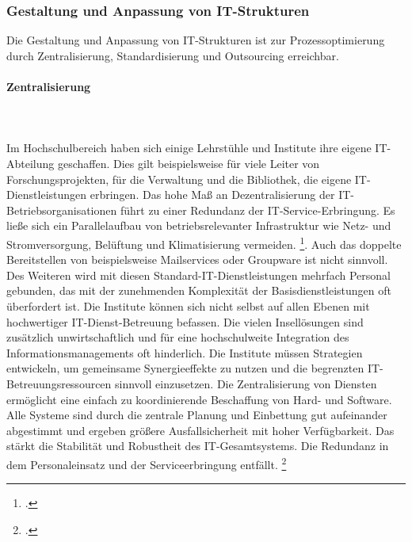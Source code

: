

\subsubsection{Gestaltung und Anpassung von IT-Strukturen}
\label{subsubsection_gestaltung_IT_strukturen}
Die Gestaltung und Anpassung von IT-Strukturen ist zur Prozessoptimierung durch Zentralisierung, Standardisierung und Outsourcing erreichbar.


\paragraph{Zentralisierung}\mbox{}\\\\
Im Hochschulbereich haben sich einige Lehrstühle und Institute ihre eigene IT-Abteilung geschaffen. Dies gilt beispielsweise für viele Leiter von Forschungsprojekten, für die Verwaltung und die Bibliothek, die eigene IT-Dienstleistungen erbringen. Das hohe Maß an Dezentralisierung der IT-Betriebsorganisationen führt zu einer Redundanz der IT-Service-Erbringung. Es ließe sich ein Parallelaufbau von betriebsrelevanter Infrastruktur wie Netz- und Stromversorgung, Belüftung und Klimatisierung vermeiden.
\footcite[Vgl.][22]{stratmann_it_2013}. Auch das doppelte Bereitstellen von beispielsweise Mailservices oder Groupware ist nicht sinnvoll. Des Weiteren wird mit diesen Standard-IT-Dienstleistungen mehrfach Personal gebunden, das mit der zunehmenden Komplexität der Basisdienstleistungen oft überfordert ist. 
Die Institute können sich nicht selbst auf allen Ebenen mit hochwertiger IT-Dienst-Betreuung befassen. Die vielen Insellösungen sind zusätzlich unwirtschaftlich und für eine hochschulweite Integration des Informationsmanagements oft hinderlich. Die Institute müssen Strategien entwickeln, um gemeinsame Synergieeffekte zu nutzen und die begrenzten IT-Betreuungsressourcen sinnvoll einzusetzen.
Die Zentralisierung von Diensten ermöglicht eine einfach zu koordinierende Beschaffung von Hard- und Software. Alle Systeme sind durch die zentrale Planung und Einbettung gut aufeinander abgestimmt und ergeben größere Ausfallsicherheit mit hoher Verfügbarkeit. Das stärkt die Stabilität und Robustheit des IT-Gesamtsystems. Die Redundanz in dem Personaleinsatz und der Serviceerbringung entfällt. \footcite[Vgl.][22]{moenkediek_2006}


